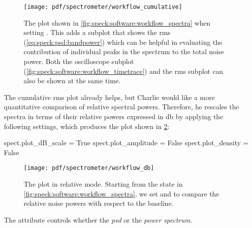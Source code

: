 \begin{figure}[htpb]
    \centering
    \texttt{[image: pdf/spectrometer/workflow\_cumulative]}
    \caption{
        The \pyspeck plot shown in \cref{fig:speck:software:workflow_spectra} when setting .
        This adds a subplot that shows the \gls{rms} (\cf \cref{eq:speck:psd:bandpower}) which can be helpful in evaluating the contribution of individual peaks in the spectrum to the total noise power.
        Both the oscilloscope subplot (\cref{fig:speck:software:workflow_timetrace}) and the \gls{rms} subplot can also be shown at the same time.
    }
    \label{fig:speck:software:workflow_cumulative}
\end{figure}

The cumulative \gls{rms} plot already helps, but Charlie would like a more quantitative comparison of relative spectral powers.
Therefore, he rescales the spectra in terms of their relative powers expressed in \unit{\decibel}
by applying the following settings, which produces the plot shown in \cref{fig:speck:software:workflow_db}:
\begin{py}
spect.plot_dB_scale = True
spect.plot_amplitude = False
spect.plot_density = False
\end{py}
\begin{figure}[htpb]
    \centering
    \texttt{[image: pdf/spectrometer/workflow\_db]}
    \caption[The \pyspeck plot in relative mode.]{
        The \pyspeck plot in relative mode.
        Starting from the state in \cref{fig:speck:software:workflow_spectra}, we set  and  to compare the relative noise powers with respect to the baseline.
    }
    \label{fig:speck:software:workflow_db}
\end{figure}
The attribute  controls whether the \emph{\acrlong{psd}} or the \emph{power spectrum}.

